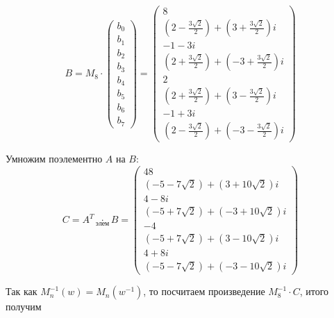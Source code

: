 \documentclass[a4paper,12pt]{article}
\begin{document}
\begin{solution}
	\begin{equation*}
	B = M_8 \cdot \left(
	\begin{array}{c}
	b_0 \\
	b_1 \\
	b_2 \\
	b_3 \\
	b_4 \\
	b_5 \\
	b_6 \\
	b_7
	\end{array}
	\right) = \left(
	\begin{array}{c}
	8 \\
	\left(2 - \frac{3\sqrt{2}}{2}\right) + \left(3 + \frac{3\sqrt{2}}{2}\right)i \\
	-1 - 3i \\
	\left(2 + \frac{3\sqrt{2}}{2}\right) + \left(-3 + \frac{3\sqrt{2}}{2}\right)i \\
	2 \\
	\left(2 + \frac{3\sqrt{2}}{2}\right) + \left(3 - \frac{3\sqrt{2}}{2}\right)i \\
	-1 + 3i \\
	\left(2 - \frac{3\sqrt{2}}{2}\right) + \left(-3 - \frac{3\sqrt{2}}{2}\right)i
	\end{array}
	\right)
	\end{equation*}
	
	Умножим поэлементно $A$ на $B$:
	\begin{equation*}
	C = A^T \underset{\text{элем}}{\cdot} B = \left(
	\begin{array}{c}
	48 \\
	(-5 - 7\sqrt{2}) + (3+10\sqrt{2})i \\
	4-8i \\
	(-5 + 7\sqrt{2}) + (-3+10\sqrt{2})i \\
	-4 \\
	(-5 + 7\sqrt{2}) + (3-10\sqrt{2})i \\
	4+8i \\
	(-5 - 7\sqrt{2}) + (-3-10\sqrt{2})i
	\end{array}
	\right)
	\end{equation*}
	
	Так как $M_n^{-1}(w) = M_n(w^{-1})$, то посчитаем произведение $M_8^{-1} \cdot C$, итого получим
	

\end{solution}
\end{document}
